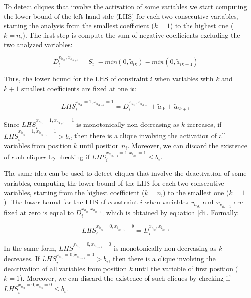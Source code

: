 \documentclass{endm}
\begin{document}
To detect cliques that involve the activation of some variables we start computing the lower bound of the left-hand side (LHS) for each two consecutive variables, starting the analysis from the smallest coefficient ($k=1$) to the highest one ($k=n_i$). The first step is compute the sum of negative coefficients excluding the two analyzed variables:

\begin{equation}\label{di}
D_{i}^{x_{\acute{a}_{ik}}, x_{\acute{a}_{ik+1}}} = S_i^- - min(0, \tilde{a}_{ik}) - min(0, \tilde{a}_{ik+1})
\end{equation}

\noindent Thus, the lower bound for the LHS of constraint $i$ when variables with $k$ and $k+1$ smallest coefficients are fixed at one is:

\begin{equation}
LHS_{i}^{x_{\acute{a}_{ik}} = 1, x_{\acute{a}_{ik+1}} = 1} = D_{i}^{x_{\acute{a}_{ik}}, x_{\acute{a}_{ik+1}}} + \tilde{a}_{ik} + \tilde{a}_{ik+1}
\end{equation}

Since $LHS_{i}^{x_{\acute{a}_{ik}} = 1, x_{\acute{a}_{ik+1}} = 1}$ is monotonically non-decreasing as $k$ increases, if $LHS_{i}^{x_{\acute{a}_{ik}} = 1, x_{\acute{a}_{ik+1}} = 1} > b_{i}$, then there is a clique involving the activation of all variables from position $k$ until position $n_i$. Moreover, we can discard the existence of such cliques by checking if $LHS_{i}^{x_{\acute{a}_{in_i-1}} = 1, x_{\acute{a}_{in_i}} = 1} \leq b_i$.

The same idea can be used to detect cliques that involve the deactivation of some variables, computing the lower bound of the LHS for each two consecutive variables, starting from the highest coefficient ($k=n_i$) to the smallest one ($k=1$). The lower bound for the LHS of constraint $i$ when variables $x_{\acute{a}_{ik}}$ and $x_{\acute{a}_{ik-1}}$ are fixed at zero is equal to $D_{i}^{x_{\acute{a}_{ik}}, x_{\acute{a}_{ik-1}}}$, which is obtained by equation \ref{di}. Formally:

\begin{equation}
LHS_{i}^{x_{\acute{a}_{ik}} = 0, x_{\acute{a}_{ik-1}} = 0} = D_{i}^{x_{\acute{a}_{ik}}, x_{\acute{a}_{ik-1}}}
\end{equation}

In the same form, $LHS_{i}^{x_{\acute{a}_{ik}} = 0, x_{\acute{a}_{ik-1}} = 0}$ is monotonically non-decreasing as $k$ decreases. If $LHS_{i}^{x_{\acute{a}_{ik}} = 0, x_{\acute{a}_{ik-1}} = 0} > b_{i}$, then there is a clique involving the deactivation of all variables from position $k$ until the variable of first position ($k=1$). Moreover, we can discard the existence of such cliques by checking if $LHS_{i}^{x_{\acute{a}_{i2}} = 0, x_{\acute{a}_{i1}} = 0} \leq b_i$.
\end{document}
